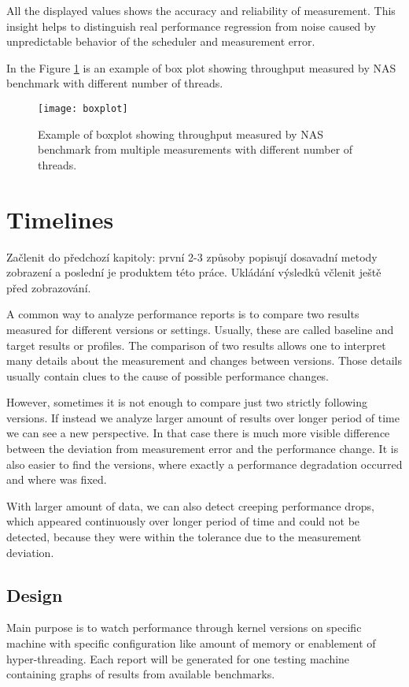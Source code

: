 All the displayed values shows the accuracy and reliability of measurement. This
insight helps to distinguish real performance regression from noise caused by
unpredictable behavior of the scheduler and measurement error.

In the Figure \ref{fig:boxplot} is an example of box plot showing throughput
measured by NAS benchmark with different number of threads.  

\begin{figure}
  \centering
  \texttt{[image: boxplot]}
  \caption{Example of boxplot showing throughput measured by NAS benchmark from
    multiple measurements with different number of threads.}
  \label{fig:boxplot}
\end{figure}



\chapter{Timelines} \label{ch:timelines}
Začlenit do předchozí kapitoly: první 2-3 způsoby popisují dosavadní metody
zobrazení a poslední je produktem této práce. Ukládání výsledků včlenit ještě
před zobrazování.

A common way to analyze performance reports is to compare two results measured
for different versions or settings. Usually, these
are called baseline and target results or profiles. The comparison of two
results allows one to
interpret many details about the measurement and changes between versions. Those
details usually contain clues to the cause of possible performance changes.

However, sometimes it is not enough to compare just two strictly following
versions. If instead we analyze larger amount
of results over longer period of time we can see a new perspective. In that case
there is much
more visible difference between the deviation from measurement error and the
performance change. It is also easier to find the versions, where exactly a
performance degradation occurred and where was fixed.

With larger amount of data, we can also detect creeping performance drops, which
appeared continuously over longer period of time and could not be detected,
because they were within the tolerance due to the measurement deviation.

\section{Design}
Main purpose is to watch performance through kernel versions on specific machine
with specific configuration like amount of memory or enablement of
hyper-threading. Each report will be generated for one testing machine
containing graphs of results from available benchmarks.

